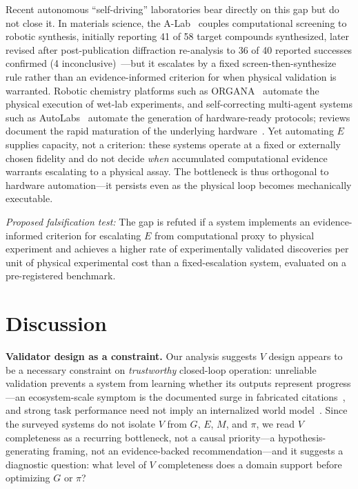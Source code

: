 \documentclass{article}
\begin{document}
Recent autonomous ``self-driving'' laboratories bear directly on this gap but do not close it. In materials science, the A-Lab~\citep{szymanski2023alab} couples computational screening to robotic synthesis, initially reporting 41 of 58 target compounds synthesized, later revised after post-publication diffraction re-analysis to 36 of 40 reported successes confirmed (4 inconclusive)~\citep{szymanski2026correction}---but it escalates by a fixed screen-then-synthesize rule rather than an evidence-informed criterion for when physical validation is warranted. Robotic chemistry platforms such as ORGANA~\citep{darvish2024organa} automate the physical execution of wet-lab experiments, and self-correcting multi-agent systems such as AutoLabs~\citep{panapitiya2025autolabs} automate the generation of hardware-ready protocols; reviews document the rapid maturation of the underlying hardware~\citep{tobias2025selfdriving}. Yet automating $E$ supplies capacity, not a criterion: these systems operate at a fixed or externally chosen fidelity and do not decide \emph{when} accumulated computational evidence warrants escalating to a physical assay. The bottleneck is thus orthogonal to hardware automation---it persists even as the physical loop becomes mechanically executable.

\textit{Proposed falsification test:} The gap is refuted if a system implements an evidence-informed criterion for escalating $E$ from computational proxy to physical experiment and achieves a higher rate of experimentally validated discoveries per unit of physical experimental cost than a fixed-escalation system, evaluated on a pre-registered benchmark.

\section{Discussion}
\label{sec:discussion}

\textbf{Validator design as a constraint.} Our analysis suggests $V$ design appears to be a necessary constraint on \emph{trustworthy} closed-loop operation: unreliable validation prevents a system from learning whether its outputs represent progress---an ecosystem-scale symptom is the documented surge in fabricated citations~\citep{zhao2026hallucinations}, and strong task performance need not imply an internalized world model~\citep{vafa2025foundationmodel}. Since the surveyed systems do not isolate $V$ from $G$, $E$, $M$, and $\pi$, we read $V$ completeness as a recurring bottleneck, not a causal priority---a hypothesis-generating framing, not an evidence-backed recommendation---and it suggests a diagnostic question: what level of $V$ completeness does a domain support before optimizing $G$ or $\pi$?
\end{document}
